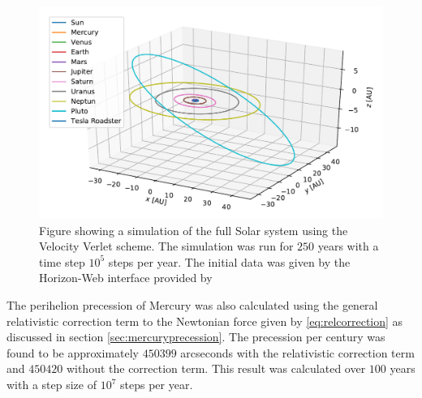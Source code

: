 \documentclass[twocolumn]{aastex62}
\begin{document}
\begin{figure}
\includegraphics[scale=1]{Figures/OuterSolarSystem.pdf}
\caption{Figure showing a simulation of the full Solar system using the Velocity Verlet scheme. The simulation was run for $250$ years with a time step $10^5$ steps per year. The initial data was given by the Horizon-Web interface provided by \citep{nasa:2018}}
\label{fig:inner}
\end{figure}

The perihelion precession of Mercury was also calculated using the general
relativistic correction term to the Newtonian force given by
\ref{eq:relcorrection} as discussed in section \ref{sec:mercuryprecession}. The
precession per century was found to be approximately $450399$ arcseconds with
the relativistic correction term and $450420$ without the correction term. This
result was calculated over $100$ years with a step size of $10^7$ steps per year.
\end{document}
